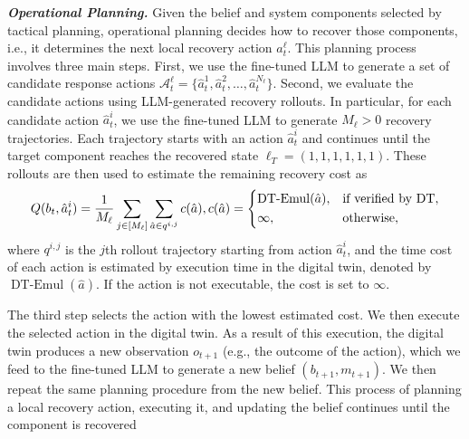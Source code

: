 \documentclass[runningheads,10pt]{llncs}
\begin{document}
\noindent\textit{\textbf{Operational Planning.}}
Given the belief and system components selected by tactical planning, operational planning decides how to recover those components, i.e., it determines the next local recovery action $a^{\ell}_t$. This planning process involves three main steps. First, we use the fine-tuned LLM to generate a set of candidate response actions
$\mathcal{A}^{\ell}_t = \{\hat{a}^1_t, \hat{a}^2_t, \hdots, \hat{a}^{N_\ell}_t\}$.
Second, we evaluate the candidate actions using LLM-generated recovery rollouts. In particular, for each candidate action $\hat{a}^i_t$, we use the fine-tuned LLM to generate $M_{\ell} > 0$ recovery trajectories. Each trajectory starts with an action $\hat{a}^i_t$ and continues until the target component reaches the recovered state $\ell_T = (1,1,1,1,1,1)$. These rollouts are then used to estimate the remaining recovery cost as
\begin{align*}
Q(b_t, \hat{a}^i_t) = \frac{1}{M_{\ell}}\sum_{j \in [M_{\ell}]}\sum_{\hat{a} \in q^{i,j}}c(\hat{a}), c(\hat{a})=
\begin{dcases}
\operatorname{DT-Emul}(\hat a), & \text{if verified by DT},\\
\infty,  & \text{otherwise},
\end{dcases} 
\end{align*}
where $q^{i,j}$ is the $j$th rollout trajectory starting from action $\hat{a}^i_t$, and the time cost of each action is estimated by execution time in the digital twin, denoted by $\operatorname{DT-Emul}(\hat{a})$. If the action is not executable, the cost is set to $\infty$. 

The third step selects the action with the lowest estimated cost. 
We then execute the selected action in the digital twin. As a result of this execution, the digital twin produces a new observation $o_{t+1}$ (e.g., the outcome of the action), which we feed to the fine-tuned LLM to generate a new belief $(b_{t+1}, m_{t+1})$. We then repeat the same planning procedure from the new belief. This process of planning a local recovery action, executing it, and updating the belief continues until the component is recovered
\end{document}
